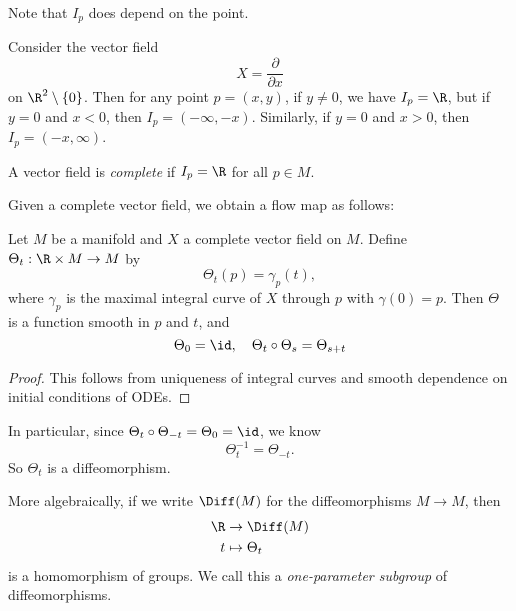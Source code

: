 \documentclass[a4paper]{article}
\begin{document}
Note that $I_p$ does depend on the point.

\begin{eg}
  Consider the vector field
  \[
    X = \frac{\partial}{\partial x}
  \]
  on $\R^2 \setminus \{0\}$. Then for any point $p = (x, y)$, if $y \not= 0$, we have $I_p = \R$, but if $y = 0$ and $x < 0$, then $I_p = (-\infty, -x)$. Similarly, if $y = 0$ and $x > 0$, then $I_p = (-x, \infty)$.
  \begin{center}
  \end{center}
\end{eg}

\begin{defi}
  A vector field is \emph{complete} if $I_p = \R$ for all $p \in M$.
\end{defi}

Given a complete vector field, we obtain a flow map as follows:
\begin{thm}
  Let $M$ be a manifold and $X$ a complete vector field on $M$. Define $\Theta_t: \R \times M \to M$ by
  \[
    \Theta_t(p) = \gamma_p(t),
  \]
  where $\gamma_p$ is the maximal integral curve of $X$ through $p$ with $\gamma(0) = p$. Then $\Theta$ is a function smooth in $p$ and $t$, and
  \[
    \Theta_0 = \id,\quad \Theta_t \circ \Theta_s = \Theta_{s + t}
  \]
\end{thm}

\begin{proof}
  This follows from uniqueness of integral curves and smooth dependence on initial conditions of ODEs.
\end{proof}

In particular, since $\Theta_t \circ \Theta_{-t} = \Theta_0 = \id$, we know
\[
  \Theta_t^{-1} = \Theta_{-t}.
\]
So $\Theta_t$ is a diffeomorphism.

More algebraically, if we write $\Diff(M)$ for the diffeomorphisms $M \to M$, then
\begin{align*}
  \R &\to \Diff(M)\\
  t &\mapsto \Theta_t
\end{align*}
is a homomorphism of groups. We call this a \emph{one-parameter subgroup} of diffeomorphisms.
\end{document}
